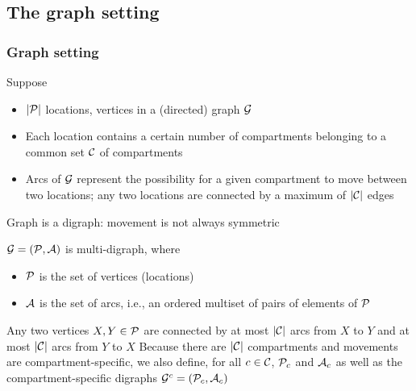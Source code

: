 \documentclass[aspectratio=43]{beamer}
\begin{document}
\subsection{The graph setting}


\begin{frame}\frametitle{Graph setting}
Suppose
\begin{itemize} 
\item $|\P|$ locations, vertices in a (directed) graph $\G$
\item Each location contains a certain number of compartments belonging to a common set $\C$ of compartments
\item Arcs of $\G$ represent the possibility for a given compartment to move between two locations; any two locations are connected by a maximum of $|\C|$ edges
\end{itemize}
\vfill
Graph is a digraph: movement is not always symmetric
\end{frame}


\begin{frame}
$\G=(\P,\A)$ is multi-digraph, where 
\begin{itemize}
	\item $\P$ is the set of vertices (locations)
	\item $\A$ is the set of arcs, i.e., an ordered multiset of pairs of elements of $\P$
\end{itemize}
\vfill
Any two vertices $X,Y\in\P$ are connected by at most $|\C|$ arcs from $X$ to $Y$ and at most $|\C|$ arcs from $Y$ to $X$
\vfill
Because there are $|\C|$ compartments and movements are compartment-specific, we also define, for all $c\in\C$, $\P_c$ and $\A_c$ as well as the compartment-specific digraphs $\G^c=(\P_c,\A_c)$
\end{frame}



\end{document}
